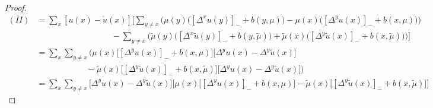 \documentclass[11pt,a4paper]{amsart}
\theoremstyle{definition}
\begin{document}
\begin{proof}
\begin{align*}
    (II)
    &= \sum_{x} [u(x)-\tilde{u}(x)] 
    \Bigg[
    \sum_{y \neq x} \Big( \mu(y)\big([\Delta^{x}u(y)]_{-} + b(y,\mu)\big) 
    - \mu(x)\big([\Delta^{y}u(x)]_{-} + b(x,\mu)\big) \Big) \\
    &\qquad\qquad\qquad\qquad\quad - \sum_{y\neq x} \Big( \tilde{\mu}(y)\big([\Delta^{x}\tilde{u}(y)]_{-} + b(y,\tilde{\mu})\big)
    + \tilde{\mu}(x)\big([\Delta^{y}\tilde{u}(x)]_{-} + b(x,\tilde{\mu})\big) \Big)
    \Bigg] \\
    &= \sum_{x}\sum_{y\neq x} 
    \Bigg(
    \mu(x) \Big[ [\Delta^{y}u(x)]_{-} + b(x,\mu) \Big] \big[\Delta^{y}u(x)-\Delta^{y}\tilde{u}(x)\big] \\
    &\qquad\qquad\qquad -\tilde{\mu}(x) \Big[ [\Delta^{y}\tilde{u}(x)]_{-} + b(x,\tilde{\mu}) \Big] \big[\Delta^{y}u(x)-\Delta^{y}\tilde{u}(x)\big]
    \Bigg) \\
    &= \sum_{x}\sum_{y\neq x} \big[\Delta^{y}u(x) - \Delta^{y}\tilde{u}(x)\big]
    \Big[
    \mu(x)\big[[\Delta^{y}u(x)]_{-}+b(x,\mu)\big] 
    - \tilde{\mu}(x)\big[[\Delta^{y}\tilde{u}(x)]_{-}+b(x,\tilde{\mu})\big]
    \Big]
\end{align*}


\end{proof}
\end{document}
